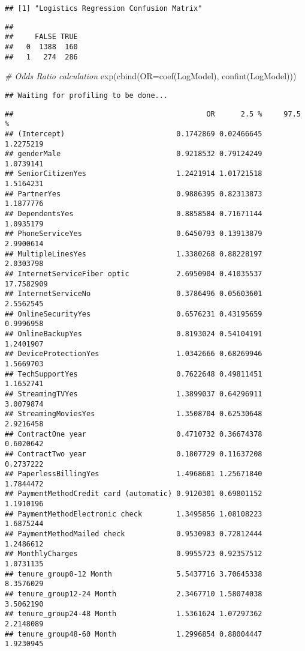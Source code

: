 \documentclass[
]{article}
\newenvironment{Shaded}{\begin{snugshade}}{\end{snugshade}}
\newcommand{\AttributeTok}[1]{\textcolor[rgb]{0.77,0.63,0.00}{#1}}
\newcommand{\CommentTok}[1]{\textcolor[rgb]{0.56,0.35,0.01}{\textit{#1}}}
\newcommand{\FunctionTok}[1]{\textcolor[rgb]{0.00,0.00,0.00}{#1}}
\newcommand{\NormalTok}[1]{#1}
\begin{document}
\begin{verbatim}
## [1] "Logistics Regression Confusion Matrix"
\end{verbatim}

\begin{verbatim}
##    
##     FALSE TRUE
##   0  1388  160
##   1   274  286
\end{verbatim}

\begin{Shaded}
\begin{Highlighting}[]
\CommentTok{\# Odds Ratio calculation}
\FunctionTok{exp}\NormalTok{(}\FunctionTok{cbind}\NormalTok{(}\AttributeTok{OR=}\FunctionTok{coef}\NormalTok{(LogModel), }\FunctionTok{confint}\NormalTok{(LogModel)))}
\end{Highlighting}
\end{Shaded}

\begin{verbatim}
## Waiting for profiling to be done...
\end{verbatim}

\begin{verbatim}
##                                             OR      2.5 %     97.5 %
## (Intercept)                          0.1742869 0.02466645  1.2275219
## genderMale                           0.9218532 0.79124249  1.0739141
## SeniorCitizenYes                     1.2421914 1.01721518  1.5164231
## PartnerYes                           0.9886395 0.82313873  1.1877776
## DependentsYes                        0.8858584 0.71671144  1.0935179
## PhoneServiceYes                      0.6450793 0.13913879  2.9900614
## MultipleLinesYes                     1.3380268 0.88228197  2.0303798
## InternetServiceFiber optic           2.6950904 0.41035537 17.7582909
## InternetServiceNo                    0.3786496 0.05603601  2.5562545
## OnlineSecurityYes                    0.6576231 0.43195659  0.9996958
## OnlineBackupYes                      0.8193024 0.54104191  1.2401907
## DeviceProtectionYes                  1.0342666 0.68269946  1.5669703
## TechSupportYes                       0.7622648 0.49811451  1.1652741
## StreamingTVYes                       1.3899037 0.64296911  3.0079874
## StreamingMoviesYes                   1.3508704 0.62530648  2.9216458
## ContractOne year                     0.4710732 0.36674378  0.6020642
## ContractTwo year                     0.1807729 0.11637208  0.2737222
## PaperlessBillingYes                  1.4968681 1.25671840  1.7844472
## PaymentMethodCredit card (automatic) 0.9120301 0.69801152  1.1910196
## PaymentMethodElectronic check        1.3495856 1.08108223  1.6875244
## PaymentMethodMailed check            0.9530983 0.72812444  1.2486612
## MonthlyCharges                       0.9955723 0.92357512  1.0731135
## tenure_group0-12 Month               5.5437716 3.70645338  8.3576029
## tenure_group12-24 Month              2.3467710 1.58074038  3.5062190
## tenure_group24-48 Month              1.5361624 1.07297362  2.2148089
## tenure_group48-60 Month              1.2996854 0.88004447  1.9230945
\end{verbatim}
\end{document}
